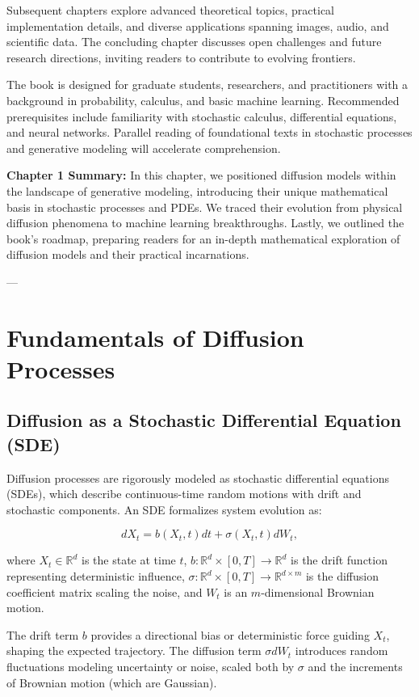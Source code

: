 Subsequent chapters explore advanced theoretical topics, practical implementation details, and diverse applications spanning images, audio, and scientific data. The concluding chapter discusses open challenges and future research directions, inviting readers to contribute to evolving frontiers.

The book is designed for graduate students, researchers, and practitioners with a background in probability, calculus, and basic machine learning. Recommended prerequisites include familiarity with stochastic calculus, differential equations, and neural networks. Parallel reading of foundational texts in stochastic processes \cite{Oksendal2003} and generative modeling \cite{Goodfellow2016} will accelerate comprehension.

\textbf{Chapter 1 Summary:}  
In this chapter, we positioned diffusion models within the landscape of generative modeling, introducing their unique mathematical basis in stochastic processes and PDEs. We traced their evolution from physical diffusion phenomena to machine learning breakthroughs. Lastly, we outlined the book's roadmap, preparing readers for an in-depth mathematical exploration of diffusion models and their practical incarnations.

---

\chapter{Fundamentals of Diffusion Processes}

\section{Diffusion as a Stochastic Differential Equation (SDE)}

Diffusion processes are rigorously modeled as stochastic differential equations (SDEs), which describe continuous-time random motions with drift and stochastic components. An SDE formalizes system evolution as:

\[
dX_t = b(X_t, t) dt + \sigma(X_t, t) dW_t,
\]

where \( X_t \in \mathbb{R}^d \) is the state at time \( t \), \( b: \mathbb{R}^d \times [0,T] \to \mathbb{R}^d \) is the drift function representing deterministic influence, \( \sigma: \mathbb{R}^d \times [0,T] \to \mathbb{R}^{d \times m} \) is the diffusion coefficient matrix scaling the noise, and \( W_t \) is an \( m \)-dimensional Brownian motion.

The drift term \( b \) provides a directional bias or deterministic force guiding \( X_t \), shaping the expected trajectory. The diffusion term \( \sigma dW_t \) introduces random fluctuations modeling uncertainty or noise, scaled both by \( \sigma \) and the increments of Brownian motion (which are Gaussian).

